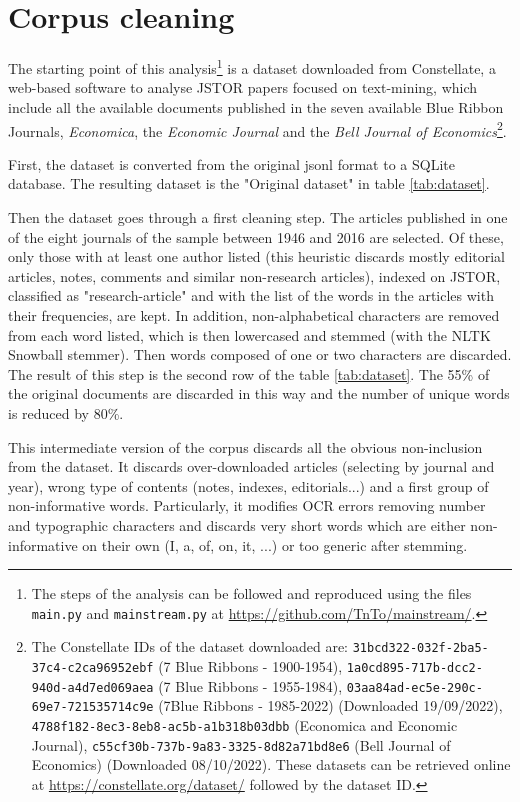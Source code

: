 \documentclass[a4paper, 11pt, headings=standardclasses, tablecaptionsbelow]{scrartcl}
\begin{document}
\section{Corpus cleaning}
The starting point of this analysis\footnote{The steps of the analysis can be followed and reproduced using the files \texttt{main.py} and \texttt{mainstream.py} at \url{https://github.com/TnTo/mainstream/}.} is a dataset downloaded from Constellate, a web-based software to analyse JSTOR papers focused on text-mining, which include all the available documents published in the seven available Blue Ribbon Journals, \textit{Economica}, the \textit{Economic Journal} and the \textit{Bell Journal of Economics}\footnote{The Constellate IDs of the dataset downloaded are: \texttt{31bcd322-032f-2ba5-37c4-c2ca96952ebf} (7 Blue Ribbons - 1900-1954), \texttt{1a0cd895-717b-dcc2-940d-a4d7ed069aea} (7 Blue Ribbons - 1955-1984), \texttt{03aa84ad-ec5e-290c-69e7-721535714c9e} (7Blue Ribbons - 1985-2022) (Downloaded 19/09/2022), \texttt{4788f182-8ec3-8eb8-ac5b-a1b318b03dbb} (Economica and Economic Journal), \texttt{c55cf30b-737b-9a83-3325-8d82a71bd8e6} (Bell Journal of Economics) (Downloaded 08/10/2022). These datasets can be retrieved online at \url{https://constellate.org/dataset/} followed by the dataset ID.}.



First, the dataset is converted from the original jsonl format to a SQLite database. The resulting dataset is the "Original dataset" in table \ref*{tab:dataset}.

Then the dataset goes through a first cleaning step. The articles published in one of the eight journals of the sample between 1946 and 2016 are selected. Of these, only those with at least one author listed (this heuristic discards mostly editorial articles, notes, comments and similar non-research articles), indexed on JSTOR, classified as "research-article" and with the list of the words in the articles with their frequencies, are kept. In addition, non-alphabetical characters are removed from each word listed, which is then lowercased and stemmed (with the NLTK Snowball stemmer). Then words composed of one or two characters are discarded.
The result of this step is the second row of the table \ref{tab:dataset}.
The 55\% of the original documents are discarded in this way and the number of unique words is reduced by 80\%.

This intermediate version of the corpus discards all the obvious non-inclusion from the dataset. It discards over-downloaded articles (selecting by journal and year), wrong type of contents (notes, indexes, editorials...) and a first group of non-informative words. Particularly, it modifies OCR errors removing number and typographic characters and discards very short words which are either non-informative on their own (I, a, of, on, it, ...) or too generic after stemming.
\end{document}
